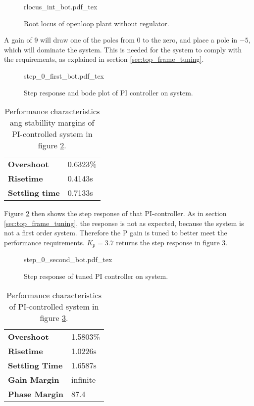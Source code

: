 \documentclass[../../../Main]{subfiles}
\begin{document}
\begin{figure}[H]
\centering
\def\svgwidth{\textwidth}
{rlocus_int_bot.pdf_tex}
\caption{Root locus of openloop plant without regulator.}
\label{fig:rlocus_int_bot}
\end{figure}

A gain of 9 will draw one of the poles from $0$ to the zero, and place a pole in $-5$, which will dominate the system. This is needed for the system to comply with the requirements, as explained in section \ref{sec:top_frame_tuning}.

\begin{figure}[H]
\centering
\def\svgwidth{\textwidth}
{step_0_first_bot.pdf_tex}
\caption{Step response and bode plot of PI controller on system.}
\label{fig:step_0_first_bot}
\end{figure}


\begin{table}[h]
	 \centering
	 \begin{tabular}{ll}
		 \textbf{Overshoot} & 0.6323\%\\
		 \textbf{Risetime}  & 0.4143s\\
		  \textbf{Settling time}& 0.7133s
	 \end{tabular}
	 \caption{Performance characteristics ang stabillity margins of PI-controlled system in figure \ref{fig:step_0_first_bot}.}
	 \label{tab:performance_0_5}
\end{table}



Figure \ref{fig:step_0_first_bot} then shows the step response of that PI-controller.
As in section \ref{sec:top_frame_tuning}, the response is not as expected, because the system is not a first order system. Therefore the P gain is tuned to better meet the performance requirements. $K_p = 3.7$ returns the step response in figure \ref{fig:step_0_second_bot}.

\begin{figure}[H]
\centering
\def\svgwidth{\textwidth}
{step_0_second_bot.pdf_tex}
\caption{Step response of tuned PI controller on system.}
\label{fig:step_0_second_bot}
\end{figure}


\begin{table}[h]
	 \centering
	 \begin{tabular}{ll}
		 \textbf{Overshoot} & 1.5803\%\\
		 \textbf{Risetime}  & 1.0226s\\
		 \textbf{Settling Time} & 1.6587s\\
	         \textbf{Gain Margin} & infinite\\
		 \textbf{Phase Margin} & 87.4\\
	 \end{tabular}
	 \caption{Performance characteristics of PI-controlled system in figure \ref{fig:step_0_second_bot}.}
	 \label{tab:performance_0_6}
\end{table}
\end{document}
